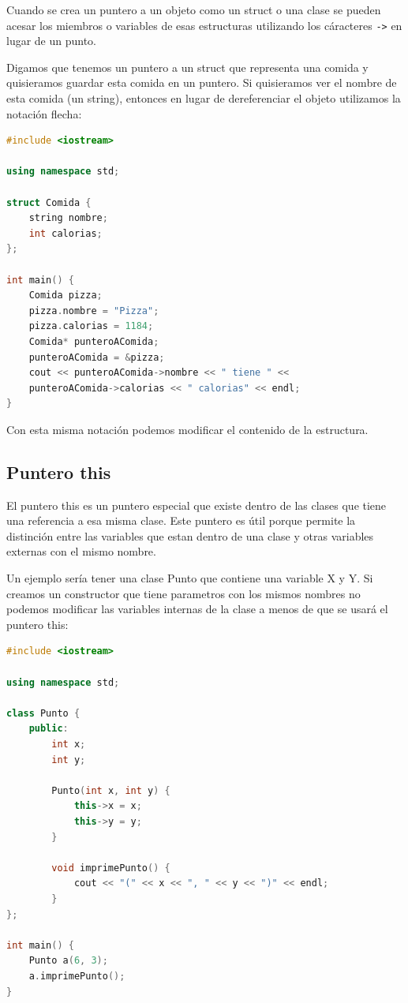\documentclass{article}
\begin{document}
Cuando se crea un puntero a un objeto como un struct o una clase se pueden acesar los miembros o variables de esas estructuras utilizando los cáracteres \lstinline{->} en lugar de un punto.

Digamos que tenemos un puntero a un struct que representa una comida y quisieramos guardar esta comida en un puntero. Si quisieramos ver el nombre de esta comida (un string), entonces en lugar de dereferenciar el objeto utilizamos la notación flecha:

\begin{lstlisting}[language=C++, title=Punteros a objetos]
#include <iostream>

using namespace std;

struct Comida {
	string nombre;
	int calorias;
};

int main() {
	Comida pizza;
	pizza.nombre = "Pizza";
	pizza.calorias = 1184;
	Comida* punteroAComida;
	punteroAComida = &pizza;
	cout << punteroAComida->nombre << " tiene " <<
	punteroAComida->calorias << " calorias" << endl;
}    
\end{lstlisting}

Con esta misma notación podemos modificar el contenido de la estructura.

\subsection{Puntero this}

El puntero this es un puntero especial que existe dentro de las clases que tiene una referencia a esa misma clase. Este puntero es útil porque permite la distinción entre las variables que estan dentro de una clase y otras variables externas con el mismo nombre.

Un ejemplo sería tener una clase Punto que contiene una variable X y Y. Si creamos un constructor que tiene parametros con los mismos nombres no podemos modificar las variables internas de la clase a menos de que se usará el puntero this:

\begin{lstlisting}[language=C++, title=Puntero this]
#include <iostream>

using namespace std;

class Punto {
	public:
		int x;
		int y;

		Punto(int x, int y) {	
			this->x = x;
			this->y = y;
		}

		void imprimePunto() {
			cout << "(" << x << ", " << y << ")" << endl;
		}
};

int main() {
	Punto a(6, 3);
	a.imprimePunto();
}    
\end{lstlisting}
\end{document}
